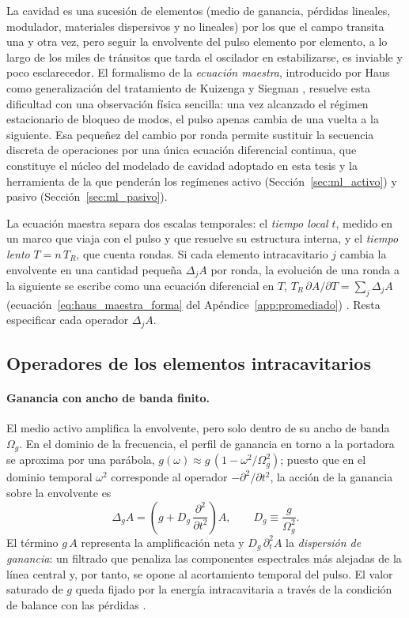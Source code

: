 La cavidad es una sucesión de elementos (medio de ganancia, pérdidas lineales, modulador, materiales dispersivos y no lineales) por los que el campo transita una y otra vez, pero seguir la envolvente del pulso elemento por elemento, a lo largo de los miles de tránsitos que tarda el oscilador en estabilizarse, es inviable y poco esclarecedor. El
formalismo de la \emph{ecuación maestra}, introducido por
Haus \cite{Haus1975fast,Haus2000} como generalización del tratamiento de
Kuizenga y Siegman \cite{KuizengaSiegman1970}, resuelve esta dificultad con una
observación física sencilla: una vez alcanzado el régimen estacionario de bloqueo
de modos, el pulso apenas cambia de una vuelta a la siguiente. Esa pequeñez del
cambio por ronda permite sustituir la secuencia discreta de operaciones por una
única ecuación diferencial continua, que constituye el núcleo del modelado de
cavidad adoptado en esta tesis y la herramienta de la que penderán los regímenes
activo (Sección~\ref{sec:ml_activo}) y pasivo (Sección~\ref{sec:ml_pasivo}).

La ecuación maestra separa dos escalas temporales: el \emph{tiempo local} $t$, medido
en un marco que viaja con el pulso y que resuelve su estructura interna, y el
\emph{tiempo lento} $T=n\,T_R$, que cuenta rondas. Si cada elemento intracavitario $j$
cambia la envolvente en una cantidad pequeña $\Delta_jA$ por ronda, la evolución de
una ronda a la siguiente se escribe como una ecuación diferencial en $T$,
$T_R\,\partial A/\partial T=\sum_j\Delta_jA$ (ecuación~\eqref{eq:haus_maestra_forma}
del Apéndice~\ref{app:promediado}) \cite[sec.~5.1]{Kaertner2020}. Resta especificar
cada operador $\Delta_jA$.

\subsection{Operadores de los elementos intracavitarios}

\paragraph{Ganancia con ancho de banda finito.}
El medio activo amplifica la envolvente, pero solo dentro de su ancho de banda
$\Omega_g$. En el dominio de la frecuencia, el perfil de ganancia en torno a la
portadora se aproxima por una parábola, $g(\omega)\approx g\,(1-\omega^2/\Omega_g^2)$;
puesto que en el dominio temporal $\omega^2$ corresponde al operador
$-\partial^2/\partial t^2$, la acción de la ganancia sobre la envolvente es
%
\begin{equation}
    \Delta_{g} A = \left( g + D_g\,\frac{\partial^2}{\partial t^2} \right) A,
    \qquad D_g \equiv \frac{g}{\Omega_g^2}.
    \label{eq:op_ganancia}
\end{equation}
%
El término $g\,A$ representa la amplificación neta y $D_g\,\partial_t^2 A$ la
\emph{dispersión de ganancia}: un filtrado que penaliza las componentes
espectrales más alejadas de la línea central y, por tanto, se opone al
acortamiento temporal del pulso. El valor saturado de $g$ queda fijado por la
energía intracavitaria a través de la condición de balance con las pérdidas
\cite[ecs.~6.44 y 6.57]{Keller2022}.

